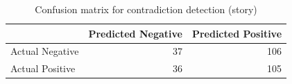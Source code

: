 \begin{table}
\caption{Confusion matrix for contradiction detection (story)}
\label{tab:confusion_matrix}
\begin{tabular}{lrr}
\toprule
 & Predicted Negative & Predicted Positive \\
\midrule
Actual Negative & 37 & 106 \\
Actual Positive & 36 & 105 \\
\bottomrule
\end{tabular}
\end{table}
